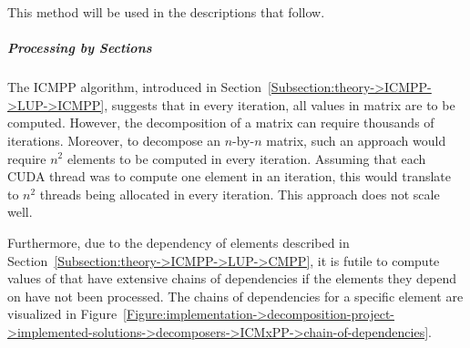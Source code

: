 This method will be used in the descriptions that follow.

\subparagraph{Processing by Sections}\label{Subparagrah:implementation->decomposition-project->implemented-solutions->decomposers->ICMxPP->processing-by-sections}
The ICMPP algorithm, introduced in Section~\ref{Subsection:theory->ICMPP->LUP->ICMPP}, suggests that in every iteration, all values in matrix  are to be computed.
However, the decomposition of a matrix can require thousands of iterations.
Moreover, to decompose an $n$-by-$n$ matrix, such an approach would require $n^2$ elements to be computed in every iteration.
Assuming that each CUDA thread was to compute one element in an iteration, this would translate to $n^2$ threads being allocated in every iteration.
This approach does not scale well.

Furthermore, due to the dependency of elements described in Section~\ref{Subsection:theory->ICMPP->LUP->CMPP}, it is futile to compute values of  that have extensive chains of dependencies if the elements they depend on have not been processed.
The chains of dependencies for a specific element are visualized in Figure~\ref{Figure:implementation->decomposition-project->implemented-solutions->decomposers->ICMxPP->chain-of-dependencies}.

